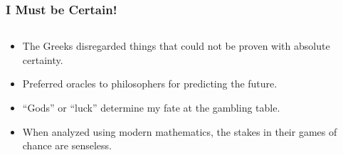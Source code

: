 \documentclass{beamer}
\begin{document}
\begin{frame}
    \frametitle{I Must be Certain!}
    \begin{columns}{}
        \begin{column}{0.75\textwidth}
            \begin{block}{}
                \begin{itemize}
                    \item The Greeks disregarded things that could not be
                        proven with absolute certainty.
                    \item Preferred oracles to philosophers for predicting the
                        future.
                    \item ``Gods'' or ``luck'' determine my fate at the
                        gambling table.
                    \item When analyzed using modern mathematics, the stakes in
                        their games of chance are senseless.
                \end{itemize}
            \end{block}
        \end{column}
        \begin{column}{0.25\textwidth}
            \begin{block}{}

\end{block}
\end{column}
\end{columns}
\end{frame}
\end{document}
